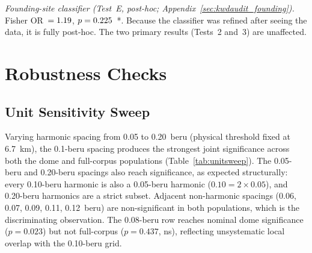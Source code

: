 \documentclass[12pt,a4paper]{article}
\begin{document}
\noindent\textit{Founding-site classifier (Test~E, post-hoc;
Appendix~\ref{sec:kwdaudit_founding}).}
Fisher OR~$= 1.19$, $p = 0.225$~*.
Because the classifier was refined after seeing the data, it is
fully post-hoc. The two primary results (Tests~2 and~3) are unaffected.

\section{Robustness Checks}
\label{sec:robustness}

\subsection{Unit Sensitivity Sweep}
\label{sec:metrology}

Varying harmonic spacing from 0.05 to 0.20~beru (physical threshold
fixed at 6.7~km), the 0.1-beru spacing produces the strongest joint
significance across both the dome and full-corpus populations
(Table~\ref{tab:unitsweep}). The 0.05-beru and 0.20-beru spacings also
reach significance, as expected structurally: every 0.10-beru harmonic is
also a 0.05-beru harmonic ($0.10 = 2 \times 0.05$), and 0.20-beru harmonics
are a strict subset. Adjacent non-harmonic spacings (0.06, 0.07, 0.09, 0.11,
0.12~beru) are non-significant in both populations, which is the
discriminating observation. The 0.08-beru row reaches nominal
dome significance ($p = 0.023$) but not full-corpus ($p = 0.437$, ns),
reflecting unsystematic local overlap with the 0.10-beru grid.
\end{document}
